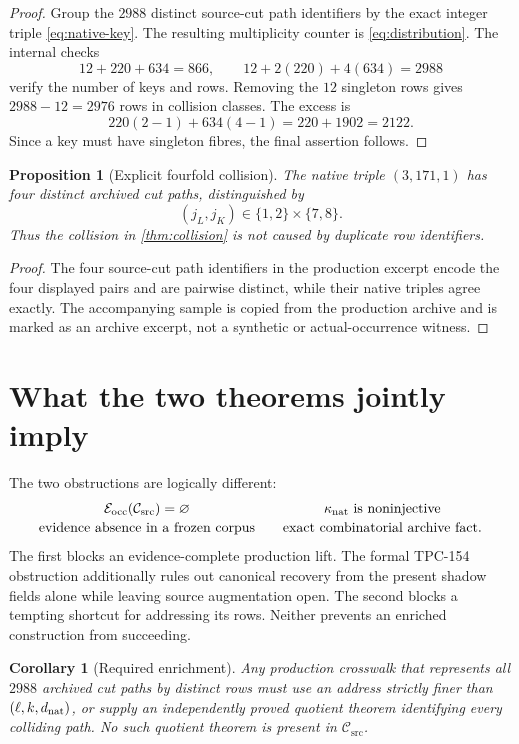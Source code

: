 \documentclass[11pt]{article}
\newtheorem{proposition}[theorem]{Proposition}
\newtheorem{corollary}[theorem]{Corollary}
\theoremstyle{definition}
\theoremstyle{remark}
\newcommand{\Csrc}{\mathcal C_{\mathrm{src}}}
\newcommand{\Nkey}{\kappa_{\mathrm{nat}}}
\begin{document}
\begin{proof}
Group the \(2988\) distinct source-cut path identifiers by the exact
integer triple \eqref{eq:native-key}.  The resulting multiplicity
counter is \eqref{eq:distribution}.  The internal checks
\[
 12+220+634=866,\qquad
 12+2(220)+4(634)=2988
\]
verify the number of keys and rows.  Removing the \(12\) singleton
rows gives \(2988-12=2976\) rows in collision classes.  The excess is
\[
 220(2-1)+634(4-1)=220+1902=2122.
\]
Since a key must have singleton fibres, the final assertion follows.
\end{proof}

\begin{proposition}[Explicit fourfold collision]\label{prop:witness}
The native triple \((3,171,1)\) has four distinct archived cut paths,
distinguished by
\[
 (j_L,j_K)\in\{1,2\}\times\{7,8\}.
\]
Thus the collision in \cref{thm:collision} is not caused by duplicate
row identifiers.
\end{proposition}

\begin{proof}
The four source-cut path identifiers in the production excerpt encode
the four displayed pairs and are pairwise distinct, while their
native triples agree exactly.  The accompanying sample is copied from
the production archive and is marked as an archive excerpt, not a
synthetic or actual-occurrence witness.
\end{proof}

\section{What the two theorems jointly imply}

The two obstructions are logically different:
\[
\begin{array}{c@{\qquad}c}
 \mathcal E_{\rm occ}(\Csrc)=\varnothing
 &
 \Nkey\text{ is noninjective}
 \\[2pt]
 \text{evidence absence in a frozen corpus}
 &
 \text{exact combinatorial archive fact}.
\end{array}
\]
The first blocks an evidence-complete production lift.  The formal
TPC-154 obstruction additionally rules out canonical recovery from
the present shadow fields alone while leaving source augmentation
open.  The second
blocks a tempting shortcut for addressing its rows.  Neither prevents
an enriched construction from succeeding.

\begin{corollary}[Required enrichment]\label{cor:enrich}
Any production crosswalk that represents all \(2988\) archived cut
paths by distinct rows must use an address strictly finer than
\((\ell,k,d_{\rm nat})\), or supply an independently proved quotient
theorem identifying every colliding path.  No such quotient theorem
is present in \(\Csrc\).
\end{corollary}
\end{document}
